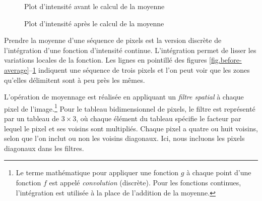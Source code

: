 \begin{figure}
\begin{minipage}{.47\textwidth}
\caption{Plot d'intensité avant le calcul de la moyenne}\label{fig.before-average}
\end{minipage}
\hspace{\fill}
\begin{minipage}{.47\textwidth}
\caption{Plot d'intensité après le calcul de la moyenne}\label{fig.after-average}
\end{minipage}
\end{figure}

Prendre la moyenne d'une séquence de pixels est la version discrète de l'intégration d'une fonction d'intensité continue. L'intégration permet de lisser les variations locales de la fonction. Les lignes en pointillé des figures \ref{fig.before-average}--\ref{fig.after-average} indiquent une séquence de trois pixels et l'on peut voir que les zones qu'elles délimitent sont à peu près les mêmes.

L'opération de moyennage est réalisée en appliquant un \emph{filtre spatial} à chaque pixel de l'image.\footnote{Le terme mathématique pour appliquer une fonction $g$ à chaque point d'une fonction $f$ est appelé \emph{convolution} (discrète). Pour les fonctions continues, l'intégration est utilisée à la place de l'addition de la moyenne.} Pour le tableau bidimensionnel de pixels, le filtre est représenté par un tableau de $3\times 3$, où chaque élément du tableau spécifie le facteur par lequel le pixel et ses voisins sont multipliés. Chaque pixel a quatre ou huit voisins, selon que l'on inclut ou non les voisins diagonaux. Ici, nous incluons les pixels diagonaux dans les filtres.

